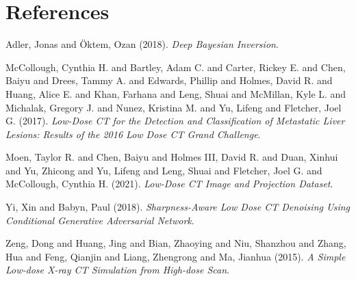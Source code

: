 \documentclass[a4paper, 11pt]{article}
\begin{document}
\section{References}
\label{sec:org9f54e4d}
\noindent
Adler, Jonas and Öktem, Ozan (2018). \emph{Deep {{Bayesian Inversion}}}.

\noindent
McCollough, Cynthia H. and Bartley, Adam C. and Carter, Rickey E. and Chen, Baiyu and Drees, Tammy A. and Edwards, Phillip and Holmes, David R. and Huang, Alice E. and Khan, Farhana and Leng, Shuai and McMillan, Kyle L. and Michalak, Gregory J. and Nunez, Kristina M. and Yu, Lifeng and Fletcher, Joel G. (2017). \emph{Low-Dose {{CT}} for the Detection and Classification of Metastatic Liver Lesions: {{Results}} of the 2016 {{Low Dose CT Grand Challenge}}}.

\noindent
Moen, Taylor R. and Chen, Baiyu and Holmes III, David R. and Duan, Xinhui and Yu, Zhicong and Yu, Lifeng and Leng, Shuai and Fletcher, Joel G. and McCollough, Cynthia H. (2021). \emph{Low-Dose {{CT}} Image and Projection Dataset}.

\noindent
Yi, Xin and Babyn, Paul (2018). \emph{Sharpness-Aware {{Low}} Dose {{CT}} Denoising Using Conditional Generative Adversarial Network}.

\noindent
Zeng, Dong and Huang, Jing and Bian, Zhaoying and Niu, Shanzhou and Zhang, Hua and Feng, Qianjin and Liang, Zhengrong and Ma, Jianhua (2015). \emph{A {{Simple Low-dose X-ray CT Simulation}} from {{High-dose Scan}}}.
\end{document}
